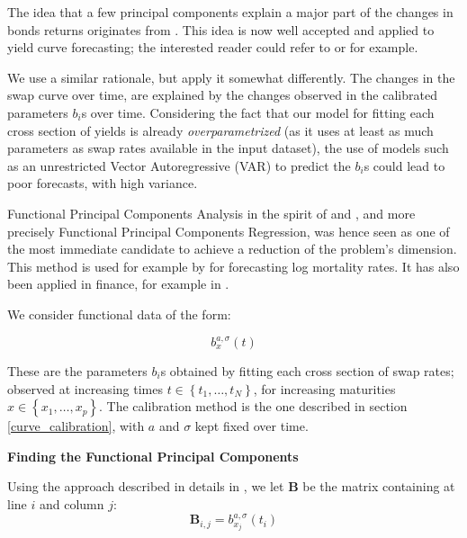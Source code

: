 The idea that a few principal components explain a major part of the changes in bonds returns originates from \cite{litterman1991volatility}. This idea is now well accepted and applied to yield curve forecasting; the interested reader could refer to \cite{diebold2006forecasting} or \cite{christensen2011affine} for example.

\medskip

We use a similar rationale, but apply it somewhat differently. The changes in the swap curve over time, are explained by the changes observed in the calibrated parameters $b_i$s over time. Considering the fact that our model for fitting each cross section of yields is already \textit{overparametrized} (as it uses at least as much parameters as swap rates available in the input dataset), the use of models such as an unrestricted Vector Autoregressive (VAR) to predict the $b_i$s could lead to poor forecasts, with high variance.

\medskip

Functional Principal Components Analysis in the spirit of \cite{ramsay1991some} and \cite{ramsay2005springer}, and more precisely Functional Principal Components Regression, was hence seen as one of the most immediate candidate to achieve a reduction of the problem's dimension. This method is used for example by \cite{hyndman2007robust} for forecasting log mortality rates. It has also been applied in finance, for example in \cite{Benko2007Functional}. 

\medskip

We consider functional data of the form:

\begin{equation}
b^{a, \sigma}_x(t)
\end{equation}

These are the parameters $b_i$s obtained by fitting each cross section of swap rates; observed at increasing times $t \in \left\lbrace t_1, \ldots, t_N \right\rbrace$, for increasing maturities $x \in \left\lbrace x_1, \ldots, x_p \right\rbrace$. The calibration method is the one  described in section \ref{curve_calibration}, with $a$ and $\sigma$ kept fixed over time.

\medskip

\textbf{Finding the Functional Principal Components}

\medskip

Using the approach described in details in \cite{ramsay2005springer}, we let $\textbf{B}$ be the matrix containing at line $i$ and column $j$:
\begin{equation}
\textbf{B}_{i,j} = b^{a, \sigma}_{x_j}(t_i)
\end{equation}


